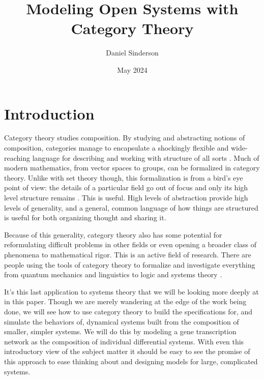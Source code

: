 \documentclass[12pt]{article}
\title{Modeling Open Systems with Category Theory}
\author{Daniel Sinderson}
\date{May 2024}
\begin{document}
\maketitle


\section*{Introduction}
Category theory studies composition.
By studying and abstracting notions of composition, categories manage to encapsulate
a shockingly flexible and wide-reaching language for describing and working with structure of all sorts \cite{fong2019invitation}.
Much of modern mathematics, from vector spaces to groups, can be formalized in category theory.
Unlike with set theory though, this formalization is from a bird's eye point of view:
the details of a particular field go out of focus and only its high level structure remains \cite{riehl2017category}.
This is useful.
High levels of abstraction provide high levels of generality,
and a general, common language of how things are structured is useful for both organizing thought and sharing it.

Because of this generality, category theory also has some potential for reformulating difficult problems in other fields or even opening a broader class of phenomena to mathematical rigor.
This is an active field of research.
There are people using the tools of category theory to formalize and investigate everything from quantum mechanics and linguistics to logic and systems theory \cite{asudeh2020enriched, Coecke_Kissinger_2017, goldblatt2014topoi, myers2022categorical}.

It's this last application to systems theory that we will be looking more deeply at in this paper.
Though we are merely wandering at the edge of the work being done, we will see how to use category theory to build the specifications for, and simulate the behaviors of, dynamical systems built from the composition of smaller, simpler systems.
We will do this by modeling a gene transcription network as the composition of individual differential systems.
With even this introductory view of the subject matter it should be easy to see the promise of this approach to ease thinking about and designing models for large, complicated systems.
\end{document}
